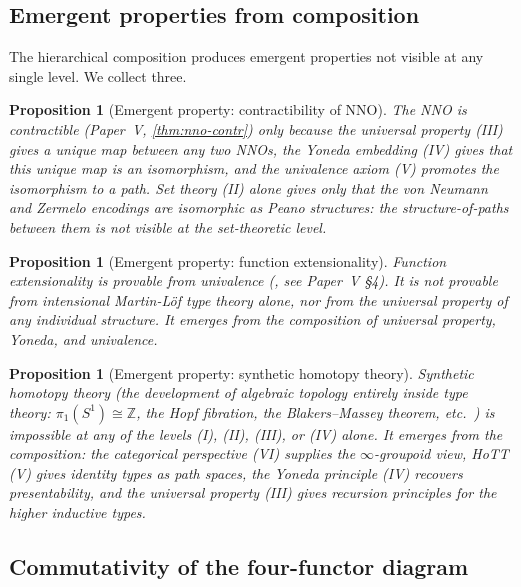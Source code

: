\documentclass[12pt]{article}
\newtheorem{proposition}[theorem]{Proposition}
\theoremstyle{definition}
\theoremstyle{remark}
\newcommand{\Z}{\mathbb{Z}}
\newcommand{\iso}{\cong}
\begin{document}
\subsection{Emergent properties from composition}

The hierarchical composition produces emergent properties not visible at
any single level. We collect three.

\begin{proposition}[Emergent property: contractibility of NNO]
\label{prop:emergent-contract}
The NNO is contractible (Paper~V, \cref{thm:nno-contr}) only because the
universal property (III) gives a unique map between any two NNOs, the
Yoneda embedding (IV) gives that this unique map is an isomorphism, and
the univalence axiom (V) promotes the isomorphism to a path. Set theory
(II) alone gives only that the von Neumann and Zermelo encodings are
isomorphic as Peano structures: the structure-of-paths between them is not
visible at the set-theoretic level.
\end{proposition}

\begin{proposition}[Emergent property: function extensionality]
\label{prop:funext}
Function extensionality is provable from univalence
(\cite[\S4.9]{HoTTBook}, see Paper~V \S4). It is not provable
from intensional Martin-L\"of type theory alone, nor from the universal
property of any individual structure. It emerges from the composition of
universal property, Yoneda, and univalence.
\end{proposition}

\begin{proposition}[Emergent property: synthetic homotopy theory]
\label{prop:synth-homotopy}
Synthetic homotopy theory (the development of algebraic topology entirely
inside type theory: $\pi_1(S^1) \iso \Z$, the Hopf fibration, the
Blakers--Massey theorem, etc.~\cite{LicataShulman,LicataFinster,ShulmanStrength})
is impossible at any of the levels (I), (II), (III), or (IV) alone. It
emerges from the composition: the categorical perspective (VI) supplies
the $\infty$-groupoid view, HoTT (V) gives identity types as path spaces,
the Yoneda principle (IV) recovers presentability, and the universal
property (III) gives recursion principles for the higher inductive types.
\end{proposition}

\subsection{Commutativity of the four-functor diagram}
\end{document}
